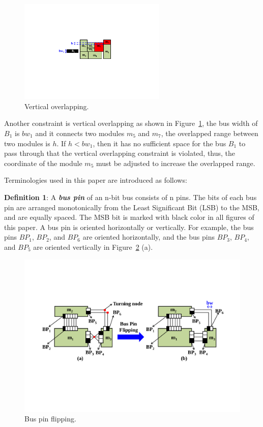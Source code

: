 \begin{figure}[htb]
  \centering
    \includegraphics[width=7cm]{Fig/vertical_overlapping.pdf}
     \caption{
      Vertical overlapping.
   }
  \label{fig::vertical_overlapping}
\end{figure}

Another constraint is vertical overlapping as shown in
Figure~\ref{fig::vertical_overlapping}, the bus width of $B_1$
is $bw_1$ and it connects two modules $m_5$ and $m_7$, the
overlapped range between two modules is $h$. If $h < bw_1$, then
it has no sufficient space for the bus $B_1$ to pass through that
the vertical overlapping constraint is violated, thus, the coordinate
of the module $m_5$ must be adjusted to increase the overlapped range.

Terminologies used in this paper are introduced as follows:

{\bf Definition 1}: A \textbf{\textit{bus pin}} of an n-bit bus
consists of n pins. The bits of each bus pin are arranged
monotonically from the Least Significant Bit (LSB) to the MSB,
and are equally spaced. The MSB bit is marked with black color
in all figures of this paper. A bus pin is
oriented horizontally or vertically. For example, the bus pins
$BP_1$, $BP_2$, and $BP_6$ are oriented horizontally, and the bus
pins $BP_3$, $BP_4$, and $BP_5$ are oriented vertically in
Figure~\ref{fig::bus_pin_flipping} (a).

\begin{figure}[htb]
  \centering
    \includegraphics[width=13cm]{Fig/bus_pin_flipping.pdf}
     \caption{
      Bus pin flipping.
   }
  \label{fig::bus_pin_flipping}
\end{figure}


